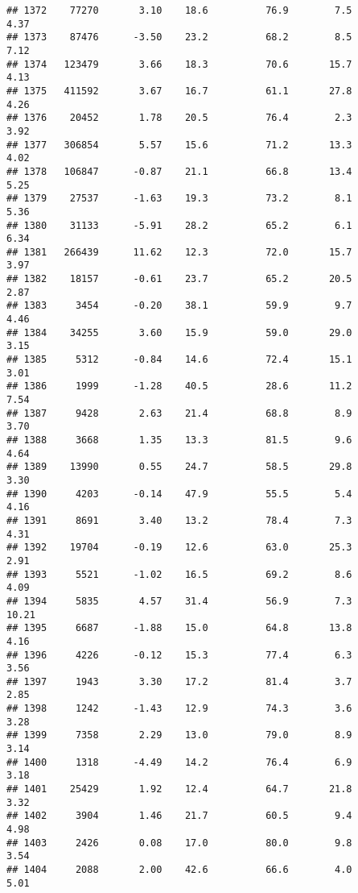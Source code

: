 \documentclass[
]{article}
\begin{document}
\begin{verbatim}
## 1372    77270       3.10    18.6          76.9        7.5              4.37
## 1373    87476      -3.50    23.2          68.2        8.5              7.12
## 1374   123479       3.66    18.3          70.6       15.7              4.13
## 1375   411592       3.67    16.7          61.1       27.8              4.26
## 1376    20452       1.78    20.5          76.4        2.3              3.92
## 1377   306854       5.57    15.6          71.2       13.3              4.02
## 1378   106847      -0.87    21.1          66.8       13.4              5.25
## 1379    27537      -1.63    19.3          73.2        8.1              5.36
## 1380    31133      -5.91    28.2          65.2        6.1              6.34
## 1381   266439      11.62    12.3          72.0       15.7              3.97
## 1382    18157      -0.61    23.7          65.2       20.5              2.87
## 1383     3454      -0.20    38.1          59.9        9.7              4.46
## 1384    34255       3.60    15.9          59.0       29.0              3.15
## 1385     5312      -0.84    14.6          72.4       15.1              3.01
## 1386     1999      -1.28    40.5          28.6       11.2              7.54
## 1387     9428       2.63    21.4          68.8        8.9              3.70
## 1388     3668       1.35    13.3          81.5        9.6              4.64
## 1389    13990       0.55    24.7          58.5       29.8              3.30
## 1390     4203      -0.14    47.9          55.5        5.4              4.16
## 1391     8691       3.40    13.2          78.4        7.3              4.31
## 1392    19704      -0.19    12.6          63.0       25.3              2.91
## 1393     5521      -1.02    16.5          69.2        8.6              4.09
## 1394     5835       4.57    31.4          56.9        7.3             10.21
## 1395     6687      -1.88    15.0          64.8       13.8              4.16
## 1396     4226      -0.12    15.3          77.4        6.3              3.56
## 1397     1943       3.30    17.2          81.4        3.7              2.85
## 1398     1242      -1.43    12.9          74.3        3.6              3.28
## 1399     7358       2.29    13.0          79.0        8.9              3.14
## 1400     1318      -4.49    14.2          76.4        6.9              3.18
## 1401    25429       1.92    12.4          64.7       21.8              3.32
## 1402     3904       1.46    21.7          60.5        9.4              4.98
## 1403     2426       0.08    17.0          80.0        9.8              3.54
## 1404     2088       2.00    42.6          66.6        4.0              5.01

\end{verbatim}
\end{document}

